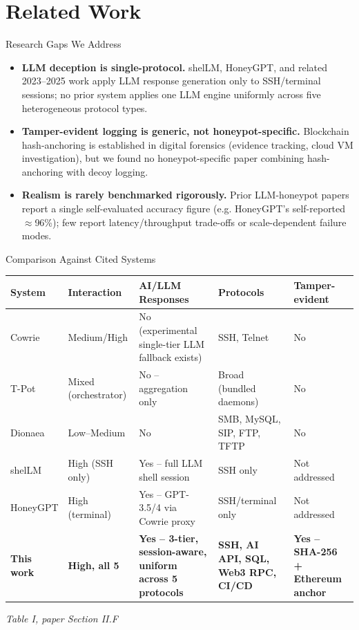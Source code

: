 \documentclass[aspectratio=169, 11pt]{beamer}
\newcommand{\srcnote}[1]{{\footnotesize\color{gray}\textit{#1}}}
\begin{document}
\section{Related Work}
\begin{frame}{Research Gaps We Address}
    \begin{itemize}
        \item \textbf{LLM deception is single-protocol.} shelLM, HoneyGPT, and related 2023--2025 work apply LLM response generation only to SSH/terminal sessions; no prior system applies one LLM engine uniformly across five heterogeneous protocol types.
        \vspace{2mm}
        \item \textbf{Tamper-evident logging is generic, not honeypot-specific.} Blockchain hash-anchoring is established in digital forensics (evidence tracking, cloud VM investigation), but we found no honeypot-specific paper combining hash-anchoring with decoy logging.
        \vspace{2mm}
        \item \textbf{Realism is rarely benchmarked rigorously.} Prior LLM-honeypot papers report a single self-evaluated accuracy figure (e.g. HoneyGPT's self-reported $\approx$96\%); few report latency/throughput trade-offs or scale-dependent failure modes.
    \end{itemize}
\end{frame}

\begin{frame}{Comparison Against Cited Systems}
    \scriptsize
    \renewcommand{\arraystretch}{1.3}
    \begin{tabular}{|p{1.7cm}|p{2.0cm}|p{3.3cm}|p{2.3cm}|p{1.7cm}|}
        \hline
        \textbf{System} & \textbf{Interaction} & \textbf{AI/LLM Responses} & \textbf{Protocols} & \textbf{Tamper-evident} \\
        \hline
        Cowrie & Medium/High & No (experimental single-tier LLM fallback exists) & SSH, Telnet & No \\
        \hline
        T-Pot & Mixed (orchestrator) & No -- aggregation only & Broad (bundled daemons) & No \\
        \hline
        Dionaea & Low--Medium & No & SMB, MySQL, SIP, FTP, TFTP & No \\
        \hline
        shelLM & High (SSH only) & Yes -- full LLM shell session & SSH only & Not addressed \\
        \hline
        HoneyGPT & High (terminal) & Yes -- GPT-3.5/4 via Cowrie proxy & SSH/terminal only & Not addressed \\
        \hline
        \textbf{This work} & \textbf{High, all 5} & \textbf{Yes -- 3-tier, session-aware, uniform across 5 protocols} & \textbf{SSH, AI API, SQL, Web3 RPC, CI/CD} & \textbf{Yes -- SHA-256 + Ethereum anchor} \\
        \hline
    \end{tabular}
    \vspace{2mm}
    \srcnote{Table I, paper Section II.F}
\end{frame}
\end{document}
